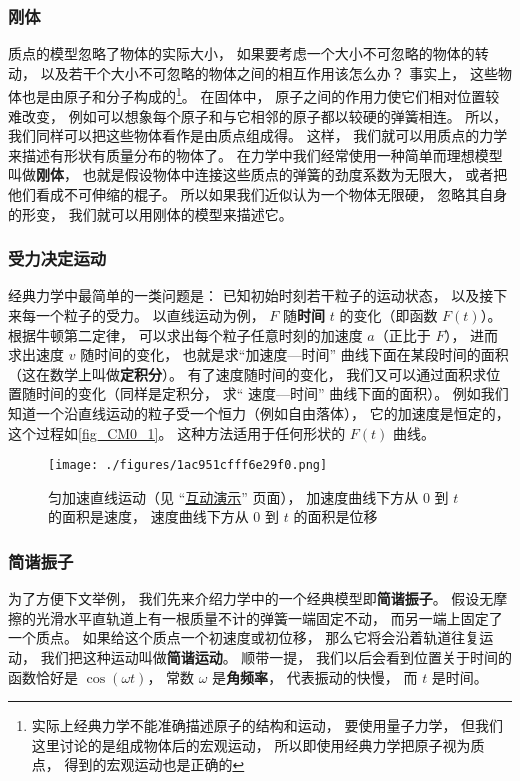 \subsubsection{刚体}
质点的模型忽略了物体的实际大小， 如果要考虑一个大小不可忽略的物体的转动， 以及若干个大小不可忽略的物体之间的相互作用该怎么办？ 事实上， 这些物体也是由原子和分子构成的\footnote{实际上经典力学不能准确描述原子的结构和运动， 要使用量子力学， 但我们这里讨论的是组成物体后的宏观运动， 所以即使用经典力学把原子视为质点， 得到的宏观运动也是正确的}。 在固体中， 原子之间的作用力使它们相对位置较难改变， 例如可以想象每个原子和与它相邻的原子都以较硬的弹簧相连。 所以， 我们同样可以把这些物体看作是由质点组成得。 这样， 我们就可以用质点的力学来描述有形状有质量分布的物体了。 在力学中我们经常使用一种简单而理想模型叫做\textbf{刚体}， 也就是假设物体中连接这些质点的弹簧的劲度系数为无限大， 或者把他们看成不可伸缩的棍子。 所以如果我们近似认为一个物体无限硬， 忽略其自身的形变， 我们就可以用刚体的模型来描述它。

\subsubsection{受力决定运动}
经典力学中最简单的一类问题是： 已知初始时刻若干粒子的运动状态， 以及接下来每一个粒子的受力。 以直线运动为例， $F$ 随\textbf{时间} $t$ 的变化（即函数 $F(t)$）。 根据牛顿第二定律， 可以求出每个粒子任意时刻的加速度 $a$（正比于 $F$）， 进而求出速度 $v$ 随时间的变化， 也就是求“加速度—时间” 曲线下面在某段时间的面积（这在数学上叫做\textbf{定积分}）。 有了速度随时间的变化， 我们又可以通过面积求位置随时间的变化（同样是定积分， 求“ 速度—时间” 曲线下面的面积）。 例如我们知道一个沿直线运动的粒子受一个恒力（例如自由落体）， 它的加速度是恒定的， 这个过程如\autoref{fig_CM0_1}。 这种方法适用于任何形状的 $F(t)$ 曲线。

\begin{figure}[ht]
\centering
\texttt{[image: ./figures/1ac951cfff6e29f0.png]}
\caption{匀加速直线运动（见 “\href{https://wuli.wiki/apps/consta.html}{互动演示}” 页面）， 加速度曲线下方从 $0$ 到 $t$ 的面积是速度， 速度曲线下方从 $0$ 到 $t$ 的面积是位移} \label{fig_CM0_1}
\end{figure}

\subsubsection{简谐振子}
为了方便下文举例， 我们先来介绍力学中的一个经典模型即\textbf{简谐振子}。 假设无摩擦的光滑水平直轨道上有一根质量不计的弹簧一端固定不动， 而另一端上固定了一个质点。 如果给这个质点一个初速度或初位移， 那么它将会沿着轨道往复运动， 我们把这种运动叫做\textbf{简谐运动}。 顺带一提， 我们以后会看到位置关于时间的函数恰好是 $\cos(\omega t)$， 常数 $\omega$ 是\textbf{角频率}， 代表振动的快慢， 而 $t$ 是时间。

